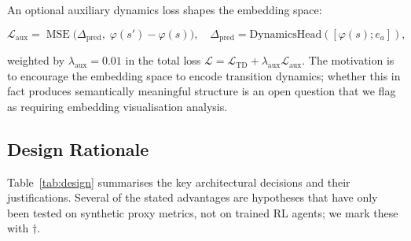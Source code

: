 \documentclass{article}
\begin{document}
An optional auxiliary dynamics loss shapes the embedding space:

\begin{equation}
\mathcal{L}_\text{aux} = \operatorname{MSE}\big(\Delta_\text{pred},\;
  \varphi(s') - \varphi(s)\big),\quad
  \Delta_\text{pred} = \text{DynamicsHead}([\varphi(s); e_a]),
\end{equation}

weighted by $\lambda_\text{aux}=0.01$ in the total loss
$\mathcal{L} = \mathcal{L}_\text{TD} + \lambda_\text{aux}
\mathcal{L}_\text{aux}$. The motivation is to encourage the embedding space to
encode transition dynamics; whether this in fact produces semantically
meaningful structure is an open question that we flag as requiring embedding
visualisation analysis.

\subsection{Design Rationale}

Table~\ref{tab:design} summarises the key architectural decisions and their
justifications. Several of the stated advantages are hypotheses that have only
been tested on synthetic proxy metrics, not on trained RL agents; we mark these
with $\dagger$.
\end{document}
